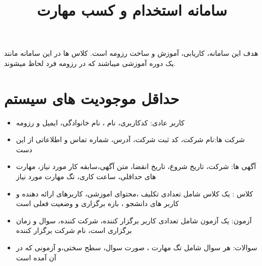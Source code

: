 \documentclass{article}
\date{}
\title{ سامانه استخدام و کسب مهارت }
\begin{document}
\maketitle
هدف این سامانه، کاریابی، آموزش و  ساخت رزومه است. کلاس ها در این سامانه مانند یک دوره آموزشی میباشند که در رزومه فرد لحاظ میشوند.
\section{حداقل موجودیت های سیستم}
    \begin{itemize}
        \item کاربر عادی: کدکاربری، نام ، نام خانوادگی، ایمیل و رزومه
        \item شرکت ها:نام شرکت، کد ثبت شرکت، آدرس، شماره تماس و اطلاعاتی از این دست
        \item آگهی ها: شرکت، تاریخ شروع، تاریخ انقضا، متن آگهی،سابقه کار مورد نیاز، مهارت های حداقلی، ساعت کاری، تگ مهارت مورد نیاز
        \item کلاس : یک کلاس شامل تعدادی تکلیف ،محتوای اموزشی، کاربرهای ارائه دهنده و کاربر های دانشجو ، بازه برگزاری و وضعیت فعلی است
        \item آزمون: یک آزمون شامل تعدادی کاربر برگزار کننده، شرکت کننده، سوال و زمان برگزاری است، نام شرکت برگزار کننده
        \item سوالات: هر سوال شامل تگ مهارت ، صورت سوال، سطح سختی،و آزمونی که در آن آمده است
    \end{itemize}
\end{document}
